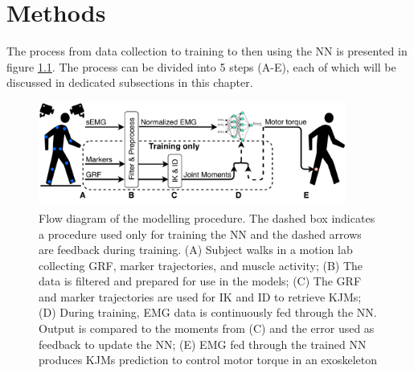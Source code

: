 \documentclass[../main.tex]{subfiles}
\begin{document}
\chapter{Methods}
\label{sec:methods}
The process from data collection to training to then using the \ac{NN} is presented in figure \ref{fig:process-diagram}. 
The process can be divided into 5 steps (A-E), each of which will be discussed in dedicated subsections in this chapter.
\begin{figure}[ht]
    \centering
    \includegraphics[width=0.9\textwidth]{img/ProcessDiagram}
    \caption{Flow diagram of the modelling procedure. The dashed box indicates a procedure used only for training the \ac{NN} and the dashed arrows are feedback during training. (A) Subject walks in a motion lab collecting \acf{GRF}, marker trajectories, and muscle activity; (B) The data is filtered and prepared for use in the models; (C) The \ac{GRF} and marker trajectories are used for \ac{IK} and \ac{ID} to retrieve \acp{KJM}; (D) During training, \ac{EMG} data is continuously fed through the \ac{NN}. Output is compared to the moments from (C) and the error used as feedback to update the \ac{NN}; (E) \ac{EMG} fed through the trained \ac{NN} produces \acp{KJM} prediction to control motor torque in an exoskeleton}
    \label{fig:process-diagram}
\end{figure}
\end{document}
